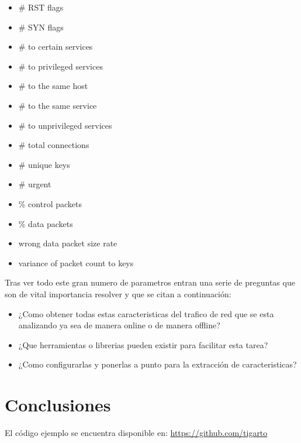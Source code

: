 \documentclass[12pt]{article}
\begin{document}
\begin{itemize}
\item \# RST flags
\item \# SYN flags
\item \# to certain services
\item \# to privileged services
\item \# to the same host
\item \# to the same service
\item \# to unprivileged services
\item \# total connections
\item \# unique keys
\item \# urgent
\item \% control packets
\item \% data packets
\item wrong data packet size rate
\item variance of packet count to keys
\end{itemize}

Tras ver todo este gran numero de parametros entran una serie de preguntas que son de vital importancia resolver y que se citan a continuación: 
\begin{itemize}
\item ¿Como obtener todas estas caracteristicas del trafico de red que se esta analizando ya sea de manera online o de manera offline?
\item ¿Que herramientas o librerias pueden existir para facilitar esta tarea?
\item ¿Como configurarlas y ponerlas a punto para la extracción de caracteristicas?
\end{itemize}




\section{Conclusiones}




El código ejemplo se encuentra disponible en: \url{https://github.com/tigarto}



\end{document}

